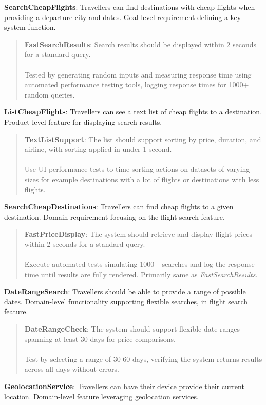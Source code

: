 \textbf{SearchCheapFlights}: Travellers can find destinations with cheap flights when providing a departure city and dates. Goal-level requirement defining a key system function.
\begin{quote}
    \textbf{FastSearchResults}: Search results should be displayed within 2 seconds for a standard query.\\ \\ 
    Tested by generating random inputs and measuring response time using automated performance testing tools, logging response times for 1000+ random queries.
\end{quote}
\textbf{ListCheapFlights}: Travellers can see a text list of cheap flights to a destination. Product-level feature for displaying search results.
\begin{quote}
    \textbf{TextListSupport}: The list should support sorting by price, duration, and airline, with sorting applied in under 1 second.\\ \\ 
    Use UI performance tests to time sorting actions on datasets of varying sizes for example destinations with a lot of flights or destinations with less flights.
\end{quote}
\textbf{SearchCheapDestinations}: Travellers can find cheap flights to a given destination. Domain requirement focusing on the flight search feature.
\begin{quote}
    \textbf{FastPriceDisplay}: The system should retrieve and display flight prices within 2 seconds for a standard query.\\ \\
    Execute automated tests simulating 1000+ searches and log the response time until results are fully rendered. Primarily same as \textit{FastSearchResults}.
\end{quote}
\textbf{DateRangeSearch}: Travellers should be able to provide a range of possible dates. Domain-level functionality supporting flexible searches, in flight search feature.
\begin{quote}
    \textbf{DateRangeCheck}: The system should support flexible date ranges spanning at least 30 days for price comparisons. \\ \\
    Test by selecting a range of 30-60 days, verifying the system returns results across all days without errors.
\end{quote}
\textbf{GeolocationService}: Travellers can have their device provide their current location. Domain-level feature leveraging geolocation services.
